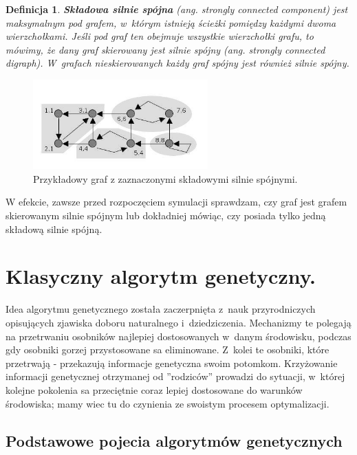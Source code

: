 \documentclass[twoside,12pt]{report}
\newtheorem{definition}{Definicja} %
\begin{document}
\vspace*{15px}

\begin{definition}
\textbf{Składowa silnie spójna} (ang. strongly connected component) jest maksymalnym pod grafem, w~którym istnieją ścieżki pomiędzy każdymi dwoma wierzchołkami. Jeśli pod graf ten obejmuje wszystkie wierzchołki grafu, to mówimy, że dany graf skierowany jest silnie spójny (ang. strongly connected digraph). W~grafach nieskierowanych każdy graf spójny jest również silnie spójny.
\end{definition}

\begin{figure}[ht]
\centering
\includegraphics[width=0.6\textwidth]{img/tajran}
\caption{Przykładowy graf z zaznaczonymi składowymi silnie spójnymi.}
\end{figure}

W efekcie, zawsze przed rozpoczęciem symulacji sprawdzam, czy graf jest grafem skierowanym silnie spójnym lub dokładniej mówiąc, czy posiada tylko jedną składową silnie spójną.

\section{Klasyczny algorytm genetyczny.}

Idea algorytmu genetycznego została zaczerpnięta z~nauk przyrodniczych opisujących zjawiska doboru naturalnego i~dziedziczenia. Mechanizmy te polegają na
przetrwaniu osobników najlepiej dostosowanych w~danym środowisku, podczas gdy
osobniki gorzej przystosowane sa eliminowane. Z~kolei te osobniki, które przetrwają
- przekazują informacje genetyczna swoim potomkom. Krzyżowanie informacji genetycznej otrzymanej od ”rodziców” prowadzi do sytuacji, w~której kolejne pokolenia sa przeciętnie coraz lepiej dostosowane do warunków środowiska; mamy wiec tu do czynienia ze swoistym procesem optymalizacji. 

\subsection{Podstawowe pojecia algorytmów genetycznych}
\end{document}

